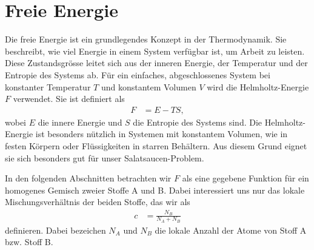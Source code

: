 %
%
%
%
\section{Freie Energie\label{cahnhilliard:section:energie}}

Die freie Energie ist ein grundlegendes Konzept in der Thermodynamik.
Sie beschreibt,
wie viel Energie in einem System verfügbar ist,
um Arbeit zu leisten.
Diese Zustandsgrösse leitet sich aus der inneren Energie,
der Temperatur und der Entropie des Systems ab.
Für ein einfaches,
abgeschlossenes System bei konstanter Temperatur $T$
und konstantem Volumen $V$ wird die Helmholtz-Energie $F$ verwendet.
Sie ist definiert als
\begin{align*}
F
& =
E - TS,
\end{align*}
wobei $E$ die innere Energie und $S$ die Entropie des Systems sind.
Die Helmholtz-Energie ist besonders nützlich in Systemen mit konstantem Volumen,
wie in festen Körpern oder Flüssigkeiten in starren Behältern.
Aus diesem Grund eignet sie sich besonders gut für unser Salatsaucen-Problem.

In den folgenden Abschnitten betrachten wir $F$ als eine gegebene Funktion
für ein homogenes Gemisch zweier Stoffe A und B.
Dabei interessiert uns nur das lokale Mischungsverhältnis der beiden Stoffe,
das wir als
\begin{align*}
c
& =
\frac{N_B}{N_A + N_B}
\end{align*}
definieren.
Dabei bezeichen $N_A$ und $N_B$ die lokale Anzahl der Atome von Stoff A bzw. Stoff B.

